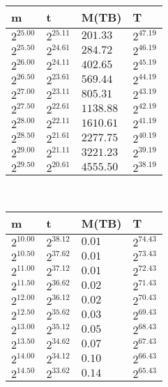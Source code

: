 \begin{tabular}{llll}
m & t & M(TB) & T \\ \hline
$2^{25.00}$ & $2^{25.11}$ & $201.33$ & $2^{47.19}$ \\
$2^{25.50}$ & $2^{24.61}$ & $284.72$ & $2^{46.19}$ \\
$2^{26.00}$ & $2^{24.11}$ & $402.65$ & $2^{45.19}$ \\
$2^{26.50}$ & $2^{23.61}$ & $569.44$ & $2^{44.19}$ \\
$2^{27.00}$ & $2^{23.11}$ & $805.31$ & $2^{43.19}$ \\
$2^{27.50}$ & $2^{22.61}$ & $1138.88$ & $2^{42.19}$ \\
$2^{28.00}$ & $2^{22.11}$ & $1610.61$ & $2^{41.19}$ \\
$2^{28.50}$ & $2^{21.61}$ & $2277.75$ & $2^{40.19}$ \\
$2^{29.00}$ & $2^{21.11}$ & $3221.23$ & $2^{39.19}$ \\
$2^{29.50}$ & $2^{20.61}$ & $4555.50$ & $2^{38.19}$ \\
\end{tabular}
 \ 
\begin{tabular}{llll}
m & t & M(TB) & T \\ \hline
$2^{10.00}$ & $2^{38.12}$ & $0.01$ & $2^{74.43}$ \\
$2^{10.50}$ & $2^{37.62}$ & $0.01$ & $2^{73.43}$ \\
$2^{11.00}$ & $2^{37.12}$ & $0.01$ & $2^{72.43}$ \\
$2^{11.50}$ & $2^{36.62}$ & $0.02$ & $2^{71.43}$ \\
$2^{12.00}$ & $2^{36.12}$ & $0.02$ & $2^{70.43}$ \\
$2^{12.50}$ & $2^{35.62}$ & $0.03$ & $2^{69.43}$ \\
$2^{13.00}$ & $2^{35.12}$ & $0.05$ & $2^{68.43}$ \\
$2^{13.50}$ & $2^{34.62}$ & $0.07$ & $2^{67.43}$ \\
$2^{14.00}$ & $2^{34.12}$ & $0.10$ & $2^{66.43}$ \\
$2^{14.50}$ & $2^{33.62}$ & $0.14$ & $2^{65.43}$ \\
\end{tabular}
 \ 
